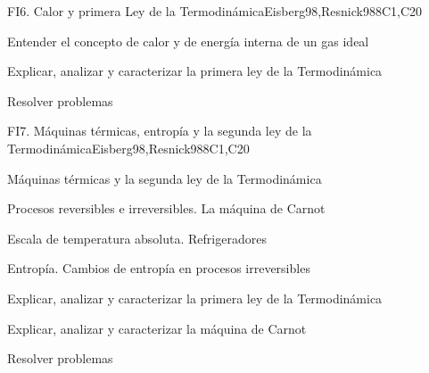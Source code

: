 \begin{syllabus}
\begin{unit}{FI6. Calor y primera Ley de la Termodinámica}{}{Eisberg98,Resnick98}{8}{C1,C20}
   \begin{learningoutcomes}
         \item  Entender el concepto de calor y de energía interna de un gas ideal
         \item  Explicar, analizar y caracterizar la primera ley de la Termodinámica
         \item  Resolver problemas
   \end{learningoutcomes}
\end{unit}

\begin{unit}{FI7. Máquinas térmicas, entropía y la segunda ley de la Termodinámica}{}{Eisberg98,Resnick98}{8}{C1,C20}
\begin{topics}
         \item  Máquinas térmicas y la segunda ley de la Termodinámica
	 \item  Procesos reversibles e irreversibles. La máquina de Carnot
         \item  Escala de temperatura absoluta. Refrigeradores
	 \item  Entropía. Cambios de entropía en procesos irreversibles
   \end{topics}

   \begin{learningoutcomes}
         \item  Explicar, analizar y caracterizar la primera ley de la Termodinámica
         \item  Explicar, analizar y caracterizar la máquina de Carnot
         \item  Resolver problemas
   \end{learningoutcomes}
\end{unit}



\begin{coursebibliography}
\end{coursebibliography}

\end{syllabus}

%
